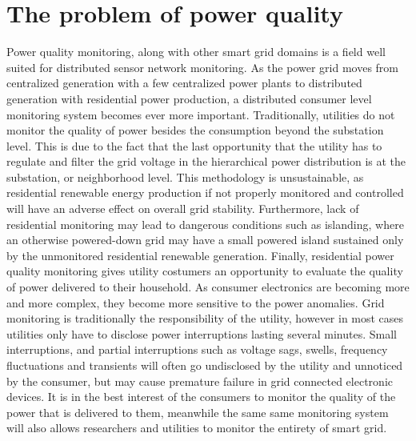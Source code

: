 \section{The problem of power quality} \label{intro:sec:pq}
Power quality monitoring, along with other smart grid domains is a field well suited for distributed sensor network monitoring.\cite{liu2017distribution} \cite{peisert2017lbnl} As the power grid moves from centralized generation with a few centralized power plants to distributed generation with residential power production, a distributed consumer level monitoring system becomes ever more important.
Traditionally, utilities do not monitor the quality of power besides the consumption beyond the substation level.
This is due to the fact that the last opportunity that the utility has to regulate and filter the grid voltage in the hierarchical power distribution is at the substation, or neighborhood level.
This methodology is unsustainable, as residential renewable energy production if not properly monitored and controlled will have an adverse effect on overall grid stability.
Furthermore, lack of residential monitoring may lead to dangerous conditions such as islanding, where an otherwise powered-down grid may have a small powered island sustained only by the unmonitored residential renewable generation.
Finally, residential power quality monitoring gives utility costumers an opportunity to evaluate the quality of power delivered to their household.
As consumer electronics are becoming more and more complex, they become more sensitive to the power anomalies.
Grid monitoring is traditionally the responsibility of the utility, however in most cases utilities only have to disclose power interruptions lasting several minutes.
Small interruptions, and partial interruptions such as voltage sags, swells, frequency fluctuations and transients will often go undisclosed by the utility and unnoticed by the consumer, but may cause premature failure in grid connected electronic devices.
It is in the best interest of the consumers to monitor the quality of the power that is delivered to them, meanwhile the same same monitoring system will also allows researchers and utilities to monitor the entirety of smart grid.

